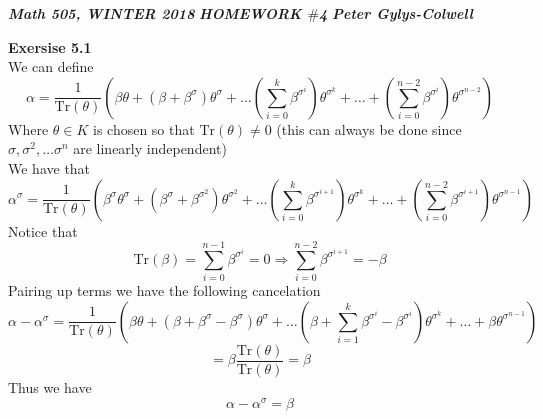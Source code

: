 \documentclass[12pt]{article}
\newenvironment{ques}[1]{\textbf{Exersise #1}\vspace{1 mm}\\ }{\bigskip}
\theoremstyle{definition}
\renewcommand{\l}{\left }
\renewcommand{\r}{\right }
\renewcommand{\t}{\theta}
\renewcommand{\a}{\alpha}
\renewcommand{\b}{\beta}
\newcommand{\Tr}{\text{Tr}}
\newcommand{\s}{\sigma}
\begin{document}
\noindent \textit{\textbf{Math 505, WINTER 2018}} \hspace{1.3cm}
\textit{\textbf{HOMEWORK $\#$4}} \hspace{1.3cm} \textit{\textbf{Peter
Gylys-Colwell}} 

\vspace{1cm}

\begin{ques}{5.1}
	We can define
	$$\a = \frac{1}{\Tr(\t)} \l(\b\t + (\b + \b^{\s})\t^{\s} +
	\dots \l(\sum_{i=0}^k \b^{\s^i} \r)\t^{\s^k} + \dots +\l(\sum_{i=0}^{n-2}
	\b^{\s^i} \r)\t^{\s^{n-2}}\r)$$
	Where $\t \in K$ is chosen so that $\Tr(\t) \neq 0$ (this can always be
	done since $\s, \s^2, \dots \s^n$ are linearly independent)\\
	We have that
	$$\a^\s = \frac{1}{\Tr(\t)} \l(\b^\s\t^\s + (\b^\s + \b^{\s^2})\t^{\s^2} +
	\dots \l(\sum_{i=0}^k \b^{\s^{i+1}} \r)\t^{\s^k} + \dots +\l(\sum_{i=0}^{n-2}
	\b^{\s^{i+1}} \r)\t^{\s^{n-1}}\r)$$
	Notice that 
	$$\Tr(\b) = \sum_{i=0}^{n-1} \b^{\s^{i}} = 0 \Rightarrow \sum_{i=0}^{n-2}
	\b^{\s^{i + 1}} = -\b$$
	Pairing up terms we have the following cancelation
	$$\a - \a^\s = \frac{1}{\Tr(\t)} \l(\b\t + (\b + \b^{\s} - \b^\s)\t^{\s} +
	\dots \l(\b + \sum_{i=1}^k \b^{\s^i} - \b^{\s^i} \r)\t^{\s^k} + \dots
	+\b\t^{\s^{n-1}}\r)$$
	$$= \b\frac{\Tr(\t)}{\Tr(\t)} = \b$$
	Thus we have
	$$\a - \a^\s = \b$$
\end{ques}
\end{document}
